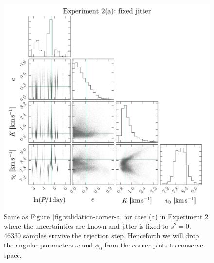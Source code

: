 \documentclass[manuscript, letterpaper]{aastex6}
\newcommand{\figname}{Figure}
\begin{document}
\begin{figure}[p]
\begin{center}
\includegraphics[width=\textwidth]{figures/undunc-corner-a.pdf}
\end{center}
\caption{%
Same as \figname~\ref{fig:validation-corner-a} for case (a) in Experiment 2 where the
uncertainties are known and jitter is fixed to $s^2 = 0$.
46330 samples survive the rejection step.
Henceforth we will drop the angular parameters $\omega$ and $\phi_0$ from the
corner plots to conserve space.
\label{fig:undunc-corner-a}}
\end{figure}
\end{document}
